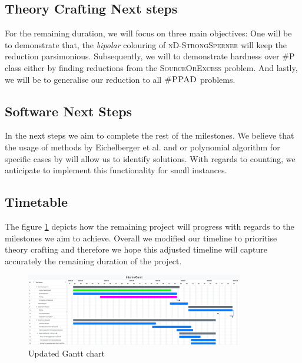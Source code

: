 \subsection{Theory Crafting Next steps}

For the remaining duration, we will focus on three main objectives:
One will be to demonstrate that, the \textit{bipolar} colouring
of \textsc{nD-StrongSperner} will keep the reduction parsimonious.
Subsequently, we will to demonstrate hardness over \textsc{\#P} class either by finding
reductions from the \textsc{SourceOrExcess} problem.
And lastly, we will be to generalise our reduction to all $\textsc{\#PPAD}$ problems.


\subsection{Software Next Steps}

In the next steps we aim to complete the rest of the milestones. 
We believe that the usage of methods by Eichelberger et al. \cite{eichelberger_HazardDetectionCombinational_1965}
and or polynomial algorithm for specific cases by \cite{deligkas_PureCircuitTightInapproximability_2024}
will allow us to identify solutions. With regards to counting, we anticipate to implement
this functionality for small instances.


\subsection{Timetable}

The figure \ref{fig:gantt-new} depicts how the remaining project will progress with regards
to the milestones we aim to achieve. Overall we modified our timeline to prioritise
theory crafting and therefore we hope this adjusted timeline will capture accurately the remaining duration
of the project.

\begin{figure}[h!]
    \centering
    \includegraphics[width=0.85\textwidth]{assets/Interim Gantt 20250708.pdf}
    \caption{Updated Gantt chart}\label{fig:gantt-new}
\end{figure}

